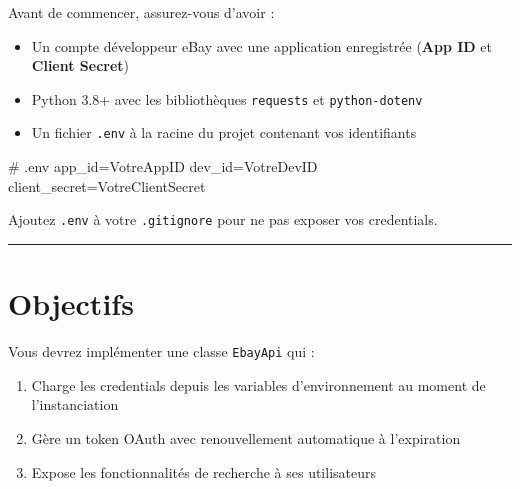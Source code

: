 \documentclass[
  french,
  letterpaper,
  DIV=11,
  numbers=noendperiod]{scrartcl}
\newenvironment{Shaded}{\begin{snugshade}}{\end{snugshade}}
\newcommand{\CommentTok}[1]{\textcolor[rgb]{0.37,0.37,0.37}{#1}}
\newcommand{\NormalTok}[1]{\textcolor[rgb]{0.00,0.23,0.31}{#1}}
\newcommand{\OperatorTok}[1]{\textcolor[rgb]{0.37,0.37,0.37}{#1}}
\newcommand{\VariableTok}[1]{\textcolor[rgb]{0.07,0.07,0.07}{#1}}
\providecommand{\tightlist}{%
  \setlength{\itemsep}{0pt}\setlength{\parskip}{0pt}}
\begin{document}
Avant de commencer, assurez-vous d'avoir :

\begin{itemize}
\tightlist
\item
  Un compte développeur eBay avec une application enregistrée
  (\textbf{App ID} et \textbf{Client Secret})
\item
  Python 3.8+ avec les bibliothèques \texttt{requests} et
  \texttt{python-dotenv}
\item
  Un fichier \texttt{.env} à la racine du projet contenant vos
  identifiants
\end{itemize}

\begin{Shaded}
\begin{Highlighting}[]
\CommentTok{\# .env}
\VariableTok{app\_id}\OperatorTok{=}\NormalTok{VotreAppID}
\VariableTok{dev\_id}\OperatorTok{=}\NormalTok{VotreDevID}
\VariableTok{client\_secret}\OperatorTok{=}\NormalTok{VotreClientSecret}
\end{Highlighting}
\end{Shaded}

\begin{tcolorbox}[enhanced jigsaw, toptitle=1mm, arc=.35mm, colbacktitle=quarto-callout-warning-color!10!white, title=\textcolor{quarto-callout-warning-color}{\faExclamationTriangle}\hspace{0.5em}{Ne commitez jamais votre fichier .env}, titlerule=0mm, toprule=.15mm, rightrule=.15mm, leftrule=.75mm, breakable, left=2mm, opacityback=0, coltitle=black, bottomrule=.15mm, colframe=quarto-callout-warning-color-frame, bottomtitle=1mm, colback=white, opacitybacktitle=0.6]

Ajoutez \texttt{.env} à votre \texttt{.gitignore} pour ne pas exposer
vos credentials.

\end{tcolorbox}

\begin{center}\rule{0.5\linewidth}{0.5pt}\end{center}

\section{Objectifs}\label{objectifs}

Vous devrez implémenter une classe \texttt{EbayApi} qui :

\begin{enumerate}
\def\labelenumi{\arabic{enumi}.}
\tightlist
\item
  Charge les credentials depuis les variables d'environnement au moment
  de l'instanciation
\item
  Gère un token OAuth avec renouvellement automatique à l'expiration
\item
  Expose les fonctionnalités de recherche à ses utilisateurs
\end{enumerate}
\end{document}
